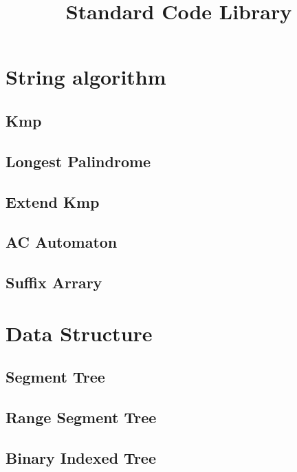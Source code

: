 \documentclass[twoside]{article}
\title{Standard Code Library}
\author{}
\newcommand\blankpage{ \null\thispagestyle{empty}\addtocounter{page}{-1}\newpage }
\begin{document}
	\maketitle
	\afterpage{\blankpage}

	\newpage
	\tableofcontents

	\newpage
	\section{String algorithm}
		\subsection{Kmp}
			
		\subsection{Longest Palindrome}
			
		\subsection{Extend Kmp}
			
		\subsection{AC Automaton}
			
		\subsection{Suffix Arrary}
			
	\newpage
	\section{Data Structure}
		\subsection{Segment Tree}
			
		\subsection{Range Segment Tree}
			
		\subsection{Binary Indexed Tree}
			
\end{document}
